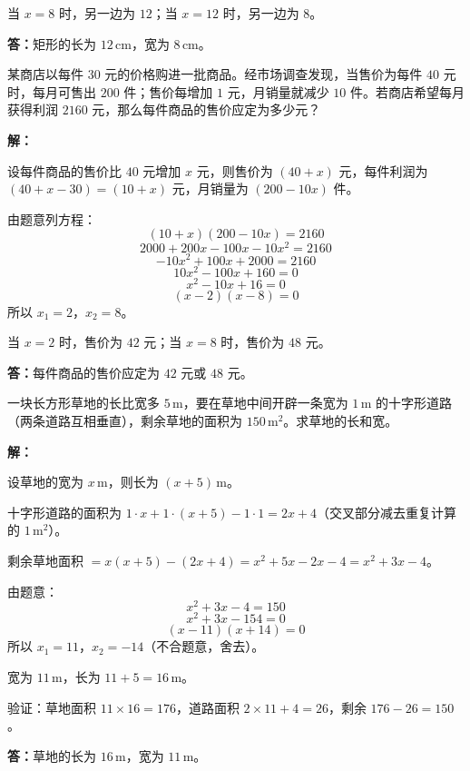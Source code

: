 \documentclass[12pt, a4paper]{ctexart}
\begin{document}
当 $x=8$ 时，另一边为 $12$；当 $x=12$ 时，另一边为 $8$。

\textbf{答：}矩形的长为 $\boxed{12}$\,cm，宽为 $\boxed{8}$\,cm。

\begin{appbox}[【应用3】利润问题]
某商店以每件 $30$ 元的价格购进一批商品。经市场调查发现，当售价为每件 $40$ 元时，每月可售出 $200$ 件；售价每增加 $1$ 元，月销量就减少 $10$ 件。若商店希望每月获得利润 $2160$ 元，那么每件商品的售价应定为多少元？
\end{appbox}

\textbf{解：}

设每件商品的售价比 $40$ 元增加 $x$ 元，则售价为 $(40+x)$ 元，每件利润为 $(40+x-30)=(10+x)$ 元，月销量为 $(200-10x)$ 件。

由题意列方程：
\[
(10+x)(200-10x) = 2160
\]
\[
2000 + 200x - 100x - 10x^2 = 2160
\]
\[
-10x^2 + 100x + 2000 = 2160
\]
\[
10x^2 - 100x + 160 = 0
\]
\[
x^2 - 10x + 16 = 0
\]
\[
(x-2)(x-8) = 0
\]
所以 $x_1=2$，$x_2=8$。

当 $x=2$ 时，售价为 $42$ 元；当 $x=8$ 时，售价为 $48$ 元。

\textbf{答：}每件商品的售价应定为 $\boxed{42}$ 元或 $\boxed{48}$ 元。

\begin{appbox}
一块长方形草地的长比宽多 $5$\,m，要在草地中间开辟一条宽为 $1$\,m 的十字形道路（两条道路互相垂直），剩余草地的面积为 $150$\,m$^2$。求草地的长和宽。
\end{appbox}

\textbf{解：}

设草地的宽为 $x$\,m，则长为 $(x+5)$\,m。

十字形道路的面积为 $1\cdot x + 1\cdot(x+5) - 1\cdot1 = 2x + 4$（交叉部分减去重复计算的 $1$\,m$^2$）。

剩余草地面积 $= x(x+5) - (2x+4) = x^2 + 5x - 2x - 4 = x^2 + 3x - 4$。

由题意：
\[
x^2 + 3x - 4 = 150
\]
\[
x^2 + 3x - 154 = 0
\]
\[
(x-11)(x+14) = 0
\]
所以 $x_1 = 11$，$x_2 = -14$（不合题意，舍去）。

宽为 $11$\,m，长为 $11+5 = 16$\,m。

验证：草地面积 $11\times16=176$，道路面积 $2\times11+4=26$，剩余 $176-26=150$。\checkmark

\textbf{答：}草地的长为 $\boxed{16}$\,m，宽为 $\boxed{11}$\,m。

\end{document}
